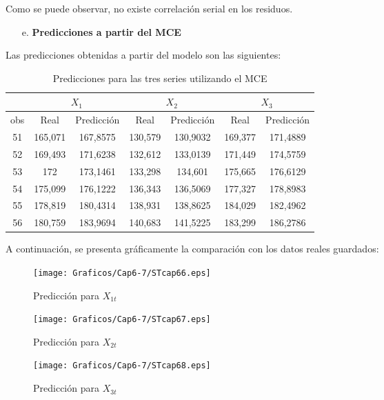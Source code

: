Como se puede observar, no existe correlaci\'{o}n serial en los residuos.

\begin{enumerate}
\item[e.] \textbf{Predicciones a partir del MCE}
\end{enumerate}

Las predicciones obtenidas a partir del modelo son las siguientes:

\begin{table}[H]
\centering
\begin{tabular}{|c|c|c|c|c|c|c|}\hline
& \multicolumn{2}{|c|}{$X_{1}$} & \multicolumn{2}{|c|}{$X_{2}$} & \multicolumn{2}{|c|}{$X_{3}$} \\ \hline
obs & Real & Predicci\'{o}n & Real & Predicci\'{o}n & Real & Predicci\'{o}n \\ \hline
51 & 165,071 & 167,8575 & 130,579 & 130,9032 & 169,377 & 171,4889 \\ \hline
52 & 169,493 & 171,6238 & 132,612 & 133,0139 & 171,449 & 174,5759 \\ \hline
53 & 172 & 173,1461 & 133,298 & 134,601 & 175,665 & 176,6129 \\ \hline
54 & 175,099 & 176,1222 & 136,343 & 136,5069 & 177,327 & 178,8983 \\ \hline
55 & 178,819 & 180,4314 & 138,931 & 138,8625 & 184,029 & 182,4962 \\ \hline
56 & 180,759 & 183,9694 & 140,683 & 141,5225 & 183,299 & 186,2786 \\ \hline
\end{tabular}
\caption{Predicciones para las tres series utilizando el MCE}
\end{table}

A continuaci\'{o}n, se presenta gr\'{a}ficamente la comparaci\'{o}n con los datos reales guardados:

\begin{figure}[H]
\centering
\texttt{[image: Graficos/Cap6-7/STcap66.eps]}
\caption{Predicci\'{o}n para $X_{1t}$}
\end{figure}

\begin{figure}[H]
\centering
\texttt{[image: Graficos/Cap6-7/STcap67.eps]}
\caption{Predicci\'{o}n para $X_{2t}$}
\end{figure}

\begin{figure}[H]
\centering
\texttt{[image: Graficos/Cap6-7/STcap68.eps]}
\caption{Predicci\'{o}n para $X_{3t}$}
\end{figure}

